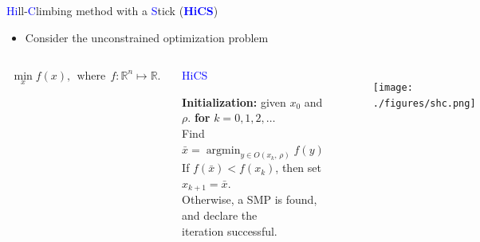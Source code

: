 \documentclass{beamer}
\DeclareMathOperator*{\argmin}{\mathrm{argmin}}
\begin{document}
\begin{frame}{\textcolor{blue}{Hi}ll-\textcolor{blue}{C}limbing
	method with a \textcolor{blue}{S}tick
	(\textcolor{blue}{\textbf{HiCS}})}

\begin{itemize}
	\item Consider the unconstrained optimization problem
\end{itemize}
\vspace{-0.3cm}
\begin{columns}[c]
	\column{8cm}
\begin{align*}
	\min_x f(x),~~ \mbox{where}~~
f: \mathbb{R}^n \mapsto \mathbb{R}.
\end{align*}
{\scriptsize
\begin{algorithm}[H]
	\caption{\textcolor{blue}{HiCS}}
	\label{alg:shc}
\begin{algorithmic}[1]
	\STATE \textbf{Initialization:} given $x_0$ and $\rho$.
	\STATE \textbf{for} $k=0,1,2,\dots$
	\\
	\hspace{0.2cm} Find $\bar{x}=\argmin_{y\in O(x_k,\,\rho)} f(y)$
			\\
	\hspace{0.2cm} If $f(\bar x)<f(x_k)$, then set $x_{k+1}= \bar{x}$.
		  \\
		   \hspace{0.2cm} Otherwise, a SMP is found, and declare the
		   \\
		   \hspace{0.2cm}
		   iteration successful.
\end{algorithmic}
\end{algorithm}
}
	\column{3.5cm}
\begin{figure}[!htbp]
	\centering
	  \texttt{[image: ./figures/shc.png]}
\end{figure}
\end{columns}

\end{frame}
\end{document}
